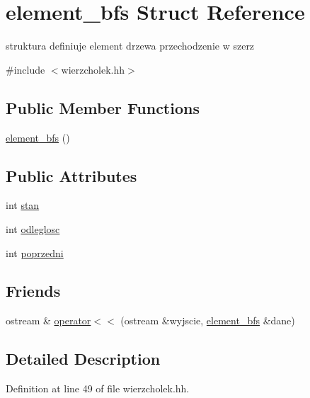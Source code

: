 \hypertarget{structelement__bfs}{\section{element\-\_\-bfs \-Struct \-Reference}
\label{structelement__bfs}
}


struktura definiuje element drzewa przechodzenie w szerz  




{\ttfamily \#include $<$wierzcholek.\-hh$>$}

\subsection*{\-Public \-Member \-Functions}
\begin{DoxyCompactItemize}
\item 
\hyperlink{structelement__bfs_a9c764ce268e74260e6634ea98ed13781}{element\-\_\-bfs} ()
\end{DoxyCompactItemize}
\subsection*{\-Public \-Attributes}
\begin{DoxyCompactItemize}
\item 
int \hyperlink{structelement__bfs_aa654df64808f513f41d0349571e4b90e}{stan}
\item 
int \hyperlink{structelement__bfs_a91fcdfed5d5dc2bce6ca9bb4414df196}{odleglosc}
\item 
int \hyperlink{structelement__bfs_a94b882f6922be485d6942f71c29e581d}{poprzedni}
\end{DoxyCompactItemize}
\subsection*{\-Friends}
\begin{DoxyCompactItemize}
\item 
ostream \& \hyperlink{structelement__bfs_a8b076b347dc8398fd7e704d74299eb3a}{operator$<$$<$} (ostream \&wyjscie, \hyperlink{structelement__bfs}{element\-\_\-bfs} \&dane)
\end{DoxyCompactItemize}


\subsection{\-Detailed \-Description}


\-Definition at line 49 of file wierzcholek.\-hh.



